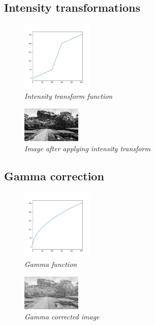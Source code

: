 \documentclass[11pt,twocolumn]{article}
\begin{document}
\subsection{Intensity transformations}
\begin{figure}[H]
\center
\includegraphics[width=0.3\textwidth]{Intensity_Transform.png}
\caption{{\small \textit{Intensity transform function}}}
\end{figure}
\begin{figure}[H]
\center
\includegraphics[width=0.25\textwidth]{Intensity_Image.png}
\caption{{\small \textit{Image after applying intensity transform}}}
\end{figure}


\subsection{Gamma correction}
\begin{figure}[H]
\center
\includegraphics[width=0.3\textwidth]{Gamma_correction.png}
\caption{{\small \textit{Gamma function}}}
\end{figure}
\begin{figure}[H]
\center
\includegraphics[width=0.25\textwidth]{Gamma_Image.png}
\caption{{\small \textit{Gamma corrected image}}}
\end{figure}
\end{document}
